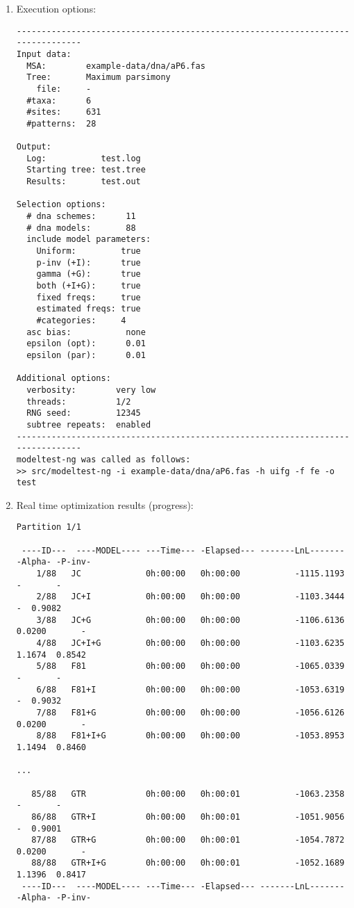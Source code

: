 \begin{enumerate}
\begin{enumerate}
\begin{lstlisting}
\end{lstlisting}

\item Execution options:

\begin{lstlisting}
--------------------------------------------------------------------------------
Input data:
  MSA:        example-data/dna/aP6.fas
  Tree:       Maximum parsimony
    file:     -
  #taxa:      6
  #sites:     631
  #patterns:  28

Output:
  Log:           test.log
  Starting tree: test.tree
  Results:       test.out

Selection options:
  # dna schemes:      11
  # dna models:       88
  include model parameters:
    Uniform:         true
    p-inv (+I):      true
    gamma (+G):      true
    both (+I+G):     true
    fixed freqs:     true
    estimated freqs: true
    #categories:     4
  asc bias:           none
  epsilon (opt):      0.01
  epsilon (par):      0.01

Additional options:
  verbosity:        very low
  threads:          1/2
  RNG seed:         12345
  subtree repeats:  enabled
--------------------------------------------------------------------------------
modeltest-ng was called as follows:
>> src/modeltest-ng -i example-data/dna/aP6.fas -h uifg -f fe -o test
\end{lstlisting}

\item Real time optimization results (progress):

\begin{lstlisting}
Partition 1/1

 ----ID---  ----MODEL---- ---Time--- -Elapsed--- -------LnL------- -Alpha- -P-inv-
    1/88   JC             0h:00:00   0h:00:00           -1115.1193       -       -
    2/88   JC+I           0h:00:00   0h:00:00           -1103.3444       -  0.9082
    3/88   JC+G           0h:00:00   0h:00:00           -1106.6136  0.0200       -
    4/88   JC+I+G         0h:00:00   0h:00:00           -1103.6235  1.1674  0.8542
    5/88   F81            0h:00:00   0h:00:00           -1065.0339       -       -
    6/88   F81+I          0h:00:00   0h:00:00           -1053.6319       -  0.9032
    7/88   F81+G          0h:00:00   0h:00:00           -1056.6126  0.0200       -
    8/88   F81+I+G        0h:00:00   0h:00:00           -1053.8953  1.1494  0.8460

...

   85/88   GTR            0h:00:00   0h:00:01           -1063.2358       -       -
   86/88   GTR+I          0h:00:00   0h:00:01           -1051.9056       -  0.9001
   87/88   GTR+G          0h:00:00   0h:00:01           -1054.7872  0.0200       -
   88/88   GTR+I+G        0h:00:00   0h:00:01           -1052.1689  1.1396  0.8417
 ----ID---  ----MODEL---- ---Time--- -Elapsed--- -------LnL------- -Alpha- -P-inv-


\end{lstlisting}
\end{enumerate}
\end{enumerate}
